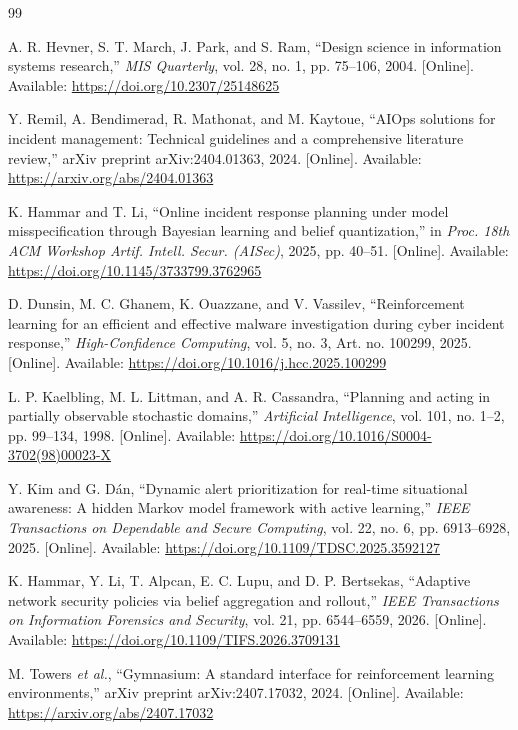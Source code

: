 \documentclass[12pt,a4paper]{article}
\begin{document}
\begin{thebibliography}{99}

 A. R. Hevner, S. T. March, J. Park, and S. Ram, ``Design science in information systems research,'' \emph{MIS Quarterly}, vol. 28, no. 1, pp. 75--106, 2004. [Online]. Available: \url{https://doi.org/10.2307/25148625}

 Y. Remil, A. Bendimerad, R. Mathonat, and M. Kaytoue, ``AIOps solutions for incident management: Technical guidelines and a comprehensive literature review,'' arXiv preprint arXiv:2404.01363, 2024. [Online]. Available: \url{https://arxiv.org/abs/2404.01363}

 K. Hammar and T. Li, ``Online incident response planning under model misspecification through Bayesian learning and belief quantization,'' in \emph{Proc. 18th ACM Workshop Artif. Intell. Secur. (AISec)}, 2025, pp. 40--51. [Online]. Available: \url{https://doi.org/10.1145/3733799.3762965}

 D. Dunsin, M. C. Ghanem, K. Ouazzane, and V. Vassilev, ``Reinforcement learning for an efficient and effective malware investigation during cyber incident response,'' \emph{High-Confidence Computing}, vol. 5, no. 3, Art. no. 100299, 2025. [Online]. Available: \url{https://doi.org/10.1016/j.hcc.2025.100299}

 L. P. Kaelbling, M. L. Littman, and A. R. Cassandra, ``Planning and acting in partially observable stochastic domains,'' \emph{Artificial Intelligence}, vol. 101, no. 1--2, pp. 99--134, 1998. [Online]. Available: \url{https://doi.org/10.1016/S0004-3702(98)00023-X}

 Y. Kim and G. D\'{a}n, ``Dynamic alert prioritization for real-time situational awareness: A hidden Markov model framework with active learning,'' \emph{IEEE Transactions on Dependable and Secure Computing}, vol. 22, no. 6, pp. 6913--6928, 2025. [Online]. Available: \url{https://doi.org/10.1109/TDSC.2025.3592127}

 K. Hammar, Y. Li, T. Alpcan, E. C. Lupu, and D. P. Bertsekas, ``Adaptive network security policies via belief aggregation and rollout,'' \emph{IEEE Transactions on Information Forensics and Security}, vol. 21, pp. 6544--6559, 2026. [Online]. Available: \url{https://doi.org/10.1109/TIFS.2026.3709131}

 M. Towers \emph{et al.}, ``Gymnasium: A standard interface for reinforcement learning environments,'' arXiv preprint arXiv:2407.17032, 2024. [Online]. Available: \url{https://arxiv.org/abs/2407.17032}


\end{thebibliography}
\end{document}
